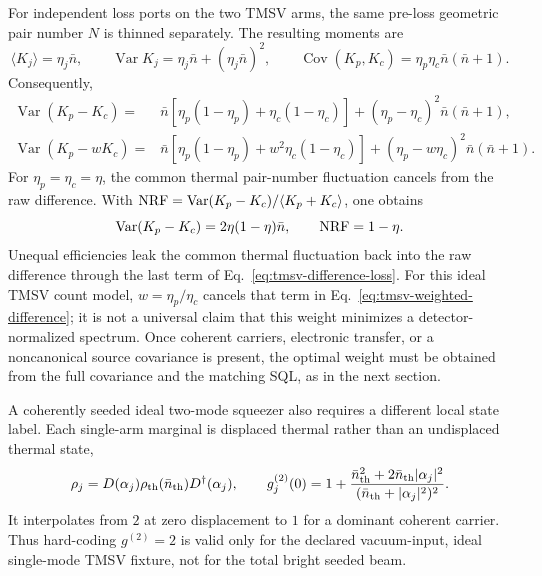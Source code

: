 \documentclass[11pt,a4paper]{article}
\begin{document}
For independent loss ports on the two TMSV arms, the same pre-loss geometric
pair number $N$ is thinned separately.  The resulting moments are
\begin{equation}
 \langle K_j\rangle=\eta_j\bar n,\qquad
 \operatorname{Var}K_j=\eta_j\bar n+(\eta_j\bar n)^2,\qquad
 \operatorname{Cov}(K_p,K_c)=\eta_p\eta_c\bar n(\bar n+1).
 \label{eq:two-arm-loss-statistics}
\end{equation}
Consequently,
\begin{align}
 \operatorname{Var}(K_p-K_c)
 ={}&\bar n\!\left[\eta_p(1-\eta_p)+\eta_c(1-\eta_c)\right]
 +(\eta_p-\eta_c)^2\bar n(\bar n+1),
 \label{eq:tmsv-difference-loss}\\
 \operatorname{Var}(K_p-wK_c)
 ={}&\bar n\!\left[\eta_p(1-\eta_p)+w^2\eta_c(1-\eta_c)\right]
 +(\eta_p-w\eta_c)^2\bar n(\bar n+1).
 \label{eq:tmsv-weighted-difference}
\end{align}
For $\eta_p=\eta_c=\eta$, the common thermal pair-number fluctuation cancels
from the raw difference.  With
${\rm NRF}=\operatorname{Var}(K_p-K_c)/\langle K_p+K_c\rangle$, one obtains
\begin{equation}
 \operatorname{Var}(K_p-K_c)=2\eta(1-\eta)\bar n,
 \qquad {\rm NRF}=1-\eta .
 \label{eq:tmsv-symmetric-nrf}
\end{equation}
Unequal efficiencies leak the common thermal fluctuation back into the raw
difference through the last term of Eq.~\eqref{eq:tmsv-difference-loss}.  For
this ideal TMSV count model, $w=\eta_p/\eta_c$ cancels that term in
Eq.~\eqref{eq:tmsv-weighted-difference}; it is not a universal claim that this
weight minimizes a detector-normalized spectrum.  Once coherent carriers,
electronic transfer, or a noncanonical source covariance is present, the
optimal weight must be obtained from the full covariance and the matching SQL,
as in the next section.

A coherently seeded ideal two-mode squeezer also requires a different local
state label.  Each single-arm marginal is displaced thermal rather than an
undisplaced thermal state,
\begin{equation}
 \rho_j=D(\alpha_j)\rho_{\rm th}(\bar n_{\rm th})D^\dagger(\alpha_j),
 \qquad
 g_j^{(2)}(0)=1+
 \frac{\bar n_{\rm th}^2+2\bar n_{\rm th}|\alpha_j|^2}
 {(\bar n_{\rm th}+|\alpha_j|^2)^2} .
 \label{eq:seeded-displaced-thermal}
\end{equation}
It interpolates from $2$ at zero displacement to $1$ for a dominant coherent
carrier.  Thus hard-coding $g^{(2)}=2$ is valid only for the declared
vacuum-input, ideal single-mode TMSV fixture, not for the total bright seeded
beam.
\end{document}
